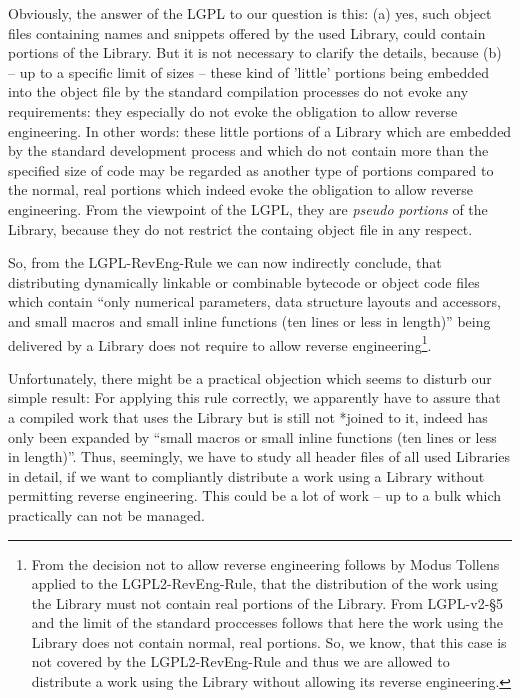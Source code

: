 Obviously, the answer of the LGPL to our question is this: (a) yes, such
object files containing names and snippets offered by the used Library, could
contain portions of the Library. But it is not necessary to clarify the details,
because (b) -- up to a specific limit of sizes -- these kind of 'little'
portions being embedded into the object file by the standard compilation
processes do not evoke any requirements: they especially do not evoke the
obligation to allow reverse engineering. In other words: these little portions
of a Library which are embedded by the standard development process and which do
not contain more than the specified size of code may be regarded as another type
of portions compared to the normal, real portions which indeed evoke the
obligation to allow reverse engineering. From the viewpoint of the LGPL, they
are \emph{pseudo portions} of the Library, because they do not restrict the
containg object file in any respect.

So, from the LGPL-RevEng-Rule we can now indirectly conclude, that distributing
dynamically linkable or combinable bytecode or object code files which contain
\enquote{only numerical parameters, data structure layouts and accessors, and
small macros and small inline functions (ten lines or less in length)} being
delivered by a Library does not require to allow reverse
engineering\footnote{From the decision not to allow reverse engineering follows
by Modus Tollens applied to the LGPL2-RevEng-Rule, that the distribution of the
work using the Library must not contain real portions of the Library. From
LGPL-v2-§5 and the limit of the standard proccesses follows that here the work
using the Library does not contain normal, real portions. So, we know, that this
case is not covered by the LGPL2-RevEng-Rule and thus we are allowed to
distribute a work using the Library without allowing its reverse engineering.}.

Unfortunately, there might be a practical objection which seems to disturb our
simple result: For applying this rule correctly, we apparently have to assure
that a compiled work that uses the Library but is still not *joined to it,
indeed has only been expanded by \enquote{small macros or small inline functions
(ten lines or less in length)}. Thus, seemingly, we have to study all header
files of all used Libraries in detail, if we want to compliantly distribute a
work using a Library without permitting reverse engineering. This could be a lot
of work -- up to a bulk which practically can not be managed.

